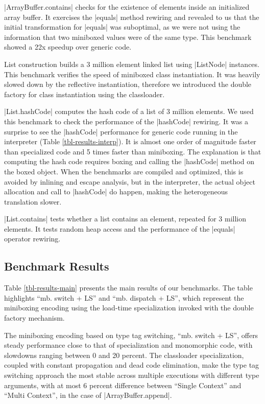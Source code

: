 |ArrayBuffer.contains| checks for the existence of elements inside an initialized array buffer. It exercises the |equals| method rewiring and revealed to us that the initial transformation for |equals| was suboptimal, as we were not using the information that two miniboxed values were of the same type. This benchmark showed a 22x speedup over generic code. 

List construction builds a 3 million element linked list using |ListNode| instances. This benchmark verifies the speed of miniboxed class instantiation. It was heavily slowed down by the reflective instantiation, therefore we introduced the double factory for class instantiation using the classloader.

|List.hashCode| computes the hash code of a list of 3 million elements. We used this benchmark to check the performance of the |hashCode| rewiring. It was a surprise to see the |hashCode| performance for generic code running in the interpreter (Table \ref{tbl-results-interp}). It is almost one order of magnitude faster than specialized code and 5 times faster than miniboxing. The explanation is that computing the hash code requires boxing and calling the |hashCode| method on the boxed object. When the benchmarks are compiled and optimized, this is avoided by inlining and escape analysis, but in the interpreter, the actual object allocation and call to |hashCode| do happen, making the heterogeneous translation slower.
 
|List.contains| tests whether a list contains an element, repeated for 3 million elements. It tests random heap access and the performance of the |equals| operator rewiring.

\subsection{Benchmark Results}
\label{subsec-eval-results}

Table \ref{tbl-results-main} presents the main results of our benchmarks. The table highlights  ``mb. switch + LS'' and ``mb. dispatch + LS'', which represent the miniboxing encoding using the load-time specialization invoked with the double factory mechanism.

The miniboxing encoding based on type tag switching, ``mb. switch + LS'', offers steady performance close to that of specialization and monomorphic code, with slowdowns ranging between 0 and 20 percent. The classloader specialization, coupled with constant propagation and dead code elimination, make the type tag switching approach the most stable across multiple executions with different type arguments, with at most 6 percent difference between ``Single Context'' and ``Multi Context'', in the case of |ArrayBuffer.append|.    

